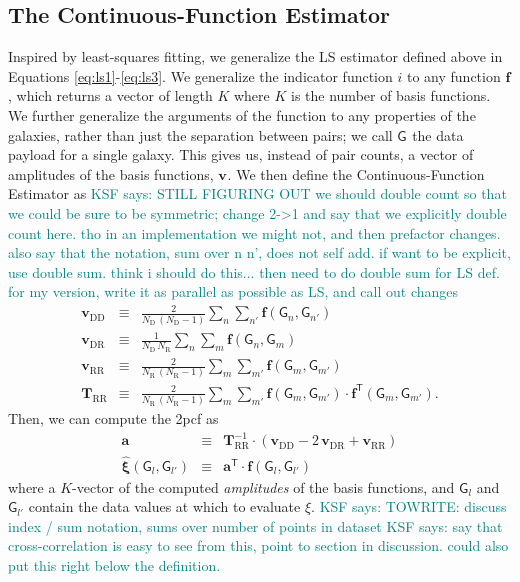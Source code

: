 \documentclass[modern]{aastex62}
\newcommand{\cf}{2pcf\xspace} %
\newcommand{\Est}{The Continuous-Function Estimator\xspace}
\newcommand{\est}{the Continuous-Function Estimator\xspace}
\newcommand{\LS}{LS\xspace}
\newcommand{\inv}{^{-1}}
\newcommand{\T}{^{\mathsf{T}}}
\newcommand{\bld}[1]{\bm{#1}} %
\newcommand{\vv}[1]{\bld{v}_\mathrm{#1}}
\newcommand{\TT}[1]{\bld{T}_\mathrm{#1}}
\newcommand{\ff}{\bld{f}}
\newcommand{\NN}[1]{N_\mathrm{#1}}
\newcommand{\GG}[1]{\mathsf{G}_{#1}}
\newcommand{\KSF}[1]{\textcolor{teal}{KSF says: #1}}
\begin{document}
\subsection{\Est}
\label{sec:est}

Inspired by least-squares fitting, we generalize the \LS estimator defined above in Equations \ref{eq:ls1}-\ref{eq:ls3}.
We generalize the indicator function $i$ to any function $\ff$, which returns a vector of length $K$ where $K$ is the number of basis functions.
We further generalize the arguments of the function to any properties of the galaxies, rather than just the separation between pairs; we call $\GG{}$ the data payload for a single galaxy.
This gives us, instead of pair counts, a vector of amplitudes of the basis functions, $\vv{}$.
We then define \est as
\KSF{STILL FIGURING OUT we should double count so that we could be sure to be symmetric; change 2->1 and say that we explicitly double count here. tho in an implementation we might not, and then prefactor changes. also say that the notation, sum over n n', does not self add. if want to be explicit, use double sum. think i should do this... then need to do double sum for LS def. for my version, write it as parallel as possible as LS, and call out changes}
\begin{eqnarray}\displaystyle
\vv{DD} &\equiv& \frac{2}{\NN{D}\,(\NN{D}-1)} \sum_{n} \sum_{n'} \ff(\GG{n}, \GG{n'}) \\
\vv{DR} &\equiv& \frac{1}{\NN{D}\,\NN{R}} \sum_{n} \sum_{m} \ff(\GG{n}, \GG{m}) \\
\vv{RR} &\equiv& \frac{2}{\NN{R}\,(\NN{R}-1)} \sum_{m} \sum_{m'} \ff(\GG{m}, \GG{m'}) \\
\TT{RR} &\equiv& \frac{2}{\NN{R}\,(\NN{R}-1)} \sum_{m} \sum_{m'} \ff(\GG{m}, \GG{m'}) \cdot \ff\T(\GG{m}, \GG{m'}). \label{eq:qq_proj}
\end{eqnarray}
Then, we can compute the \cf as
\begin{eqnarray}\displaystyle
\bld{a} &\equiv& \TT{RR}\inv \cdot (\vv{DD} - 2\,\vv{DR} + \vv{RR}) \\
\bld{\hat{\xi}}(\GG{l}, \GG{l'})  &\equiv& \bld{a}\T \cdot \ff(\GG{l}, \GG{l'}) \label{eq:xi_proj}
\end{eqnarray}
where a $K$-vector of the computed \emph{amplitudes} of the basis functions, and $\GG{l}$ and $\GG{l'}$ contain the data values at which to evaluate $\xi$.
\KSF{TOWRITE: discuss index / sum notation, sums over number of points in dataset}
\KSF{say that cross-correlation is easy to see from this, point to section in discussion. could also put this right below the definition.}
\end{document}
